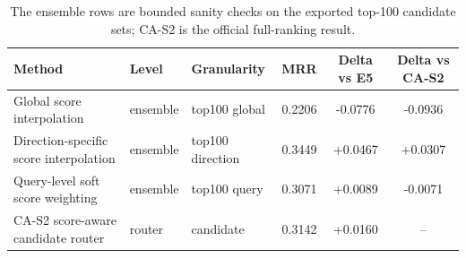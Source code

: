 \begin{table}[t]
\centering
\small
\caption{Simple score-ensemble sanity baselines compared with CA-S2. Ensemble baselines use exported top-100 candidate score sets, select policies on development data, and are reported as candidate-set sanity checks rather than official full-ranking replacements.}
\label{tab:score_ensemble_baselines}
\setlength{\tabcolsep}{4pt}
\begin{tabular}{p{}p{}p{}ccc}
\toprule
Method & Level & Granularity & MRR & Delta vs E5 & Delta vs CA-S2 \\
\midrule
Global score interpolation & ensemble & top100 global & 0.2206 & -0.0776 & -0.0936 \\
Direction-specific score interpolation & ensemble & top100 direction & 0.3449 & +0.0467 & +0.0307 \\
Query-level soft score weighting & ensemble & top100 query & 0.3071 & +0.0089 & -0.0071 \\
CA-S2 score-aware candidate router & router & candidate & 0.3142 & +0.0160 & -- \\
\bottomrule
\end{tabular}
\vspace{0.4ex}\caption*{\footnotesize The ensemble rows are bounded sanity checks on the exported top-100 candidate sets; CA-S2 is the official full-ranking result.}
\end{table}
